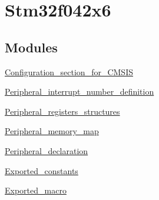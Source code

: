 \hypertarget{group__stm32f042x6}{}\section{Stm32f042x6}
\label{group__stm32f042x6}
\subsection*{Modules}
\begin{DoxyCompactItemize}
\item 
\hyperlink{group___configuration__section__for___c_m_s_i_s}{Configuration\+\_\+section\+\_\+for\+\_\+\+C\+M\+S\+IS}
\item 
\hyperlink{group___peripheral__interrupt__number__definition}{Peripheral\+\_\+interrupt\+\_\+number\+\_\+definition}
\item 
\hyperlink{group___peripheral__registers__structures}{Peripheral\+\_\+registers\+\_\+structures}
\item 
\hyperlink{group___peripheral__memory__map}{Peripheral\+\_\+memory\+\_\+map}
\item 
\hyperlink{group___peripheral__declaration}{Peripheral\+\_\+declaration}
\item 
\hyperlink{group___exported__constants}{Exported\+\_\+constants}
\item 
\hyperlink{group___exported__macro}{Exported\+\_\+macro}
\end{DoxyCompactItemize}
